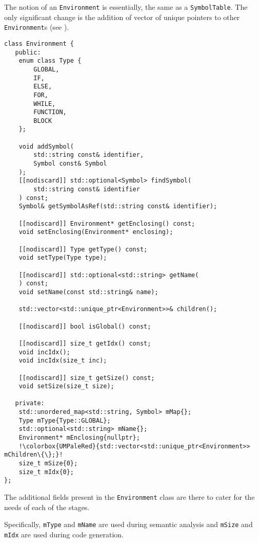 The notion of an \texttt{Environment} is essentially, the same
as a \texttt{SymbolTable}. The only significant change is the
addition of vector of unique pointers to other \\
\texttt{Environment}s (see ).

\begin{lstlisting}[escapechar=!,caption={The
\texttt{Environment} class with \texttt{mChildren} highlighted
(backend/Environment.hpp).}, label=lst:envclass]
class Environment {
   public:
    enum class Type {
        GLOBAL,
        IF,
        ELSE,
        FOR,
        WHILE,
        FUNCTION,
        BLOCK
    };

    void addSymbol(
        std::string const& identifier,
        Symbol const& Symbol
    );
    [[nodiscard]] std::optional<Symbol> findSymbol(
        std::string const& identifier
    ) const;
    Symbol& getSymbolAsRef(std::string const& identifier);

    [[nodiscard]] Environment* getEnclosing() const;
    void setEnclosing(Environment* enclosing);

    [[nodiscard]] Type getType() const;
    void setType(Type type);

    [[nodiscard]] std::optional<std::string> getName(
    ) const;
    void setName(const std::string& name);

    std::vector<std::unique_ptr<Environment>>& children();

    [[nodiscard]] bool isGlobal() const;

    [[nodiscard]] size_t getIdx() const;
    void incIdx();
    void incIdx(size_t inc);

    [[nodiscard]] size_t getSize() const;
    void setSize(size_t size);

   private:
    std::unordered_map<std::string, Symbol> mMap{};
    Type mType{Type::GLOBAL};
    std::optional<std::string> mName{};
    Environment* mEnclosing{nullptr};
    !\colorbox{UMPaleRed}{std::vector<std::unique_ptr<Environment>> mChildren\{\};}!
    size_t mSize{0};
    size_t mIdx{0};
};
\end{lstlisting}

The additional fields present in the \texttt{Environment} class
are there to cater for the needs of each of the stages.

Specifically,\label{sss:extrafields} \texttt{mType} and
\texttt{mName} are used during semantic analysis and
\texttt{mSize} and \texttt{mIdx} are used during code
generation.

